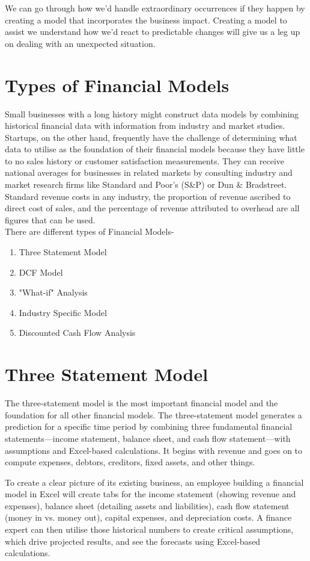 \documentclass{article}
\begin{document}
We can go through how we'd handle extraordinary occurrences if they happen by creating a model that incorporates the business impact. Creating a model to assist we understand how we'd react to predictable changes will give us a leg up on dealing with an unexpected situation.

\section{Types of Financial Models}
Small businesses with a long history might construct data models by combining historical financial data with information from industry and market studies. Startups, on the other hand, frequently have the challenge of determining what data to utilise as the foundation of their financial models because they have little to no sales history or customer satisfaction measurements. They can receive national averages for businesses in related markets by consulting industry and market research firms like Standard and Poor's (S&P) or Dun & Bradstreet. Standard revenue costs in any industry, the proportion of revenue ascribed to direct cost of sales, and the percentage of revenue attributed to overhead are all figures that can be used.
\\
There are different types of Financial Models-
\begin{enumerate}
    \item Three Statement Model
    \item DCF Model
    \item "What-if" Analysis
    \item Industry Specific Model
    \item Discounted Cash Flow Analysis
\end{enumerate}
\section{Three Statement Model}
The three-statement model is the most important financial model and the foundation for all other financial models. The three-statement model generates a prediction for a specific time period by combining three fundamental financial statements—income statement, balance sheet, and cash flow statement—with assumptions and Excel-based calculations. It begins with revenue and goes on to compute expenses, debtors, creditors, fixed assets, and other things.

To create a clear picture of its existing business, an employee building a financial model in Excel will create tabs for the income statement (showing revenue and expenses), balance sheet (detailing assets and liabilities), cash flow statement (money in vs. money out), capital expenses, and depreciation costs. A finance expert can then utilise those historical numbers to create critical assumptions, which drive projected results, and see the forecasts using Excel-based calculations.
\end{document}
